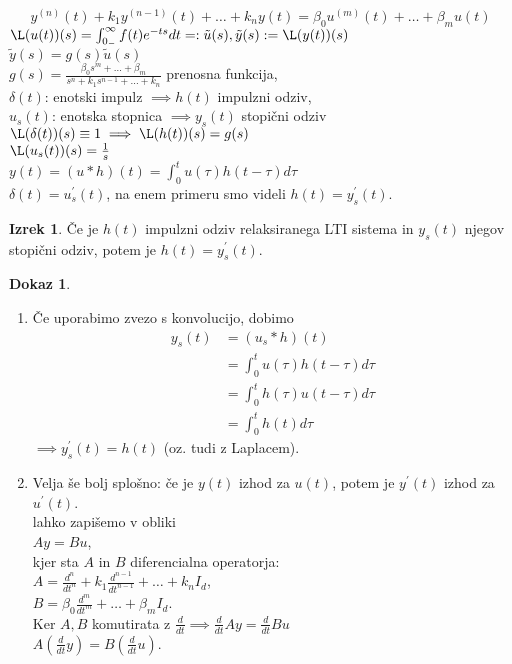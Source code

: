 \documentclass[a4paper, 12pt]{book}
\theoremstyle{definition}
\newtheorem{theorem}[counter]{Izrek}
\newtheorem{pro}[counter]{Dokaz}
\theoremstyle{remark}
\begin{document}

\begin{equation}
  \label{eq:sistem-poly}
  y^{(n)}(t) + k_1 y^{(n-1)}(t) + \dots + k_n y(t) = \beta_0 u^{(m)}(t) + \dots + \beta_m u(t)
\end{equation}
$\L(u(t))(s) = \int_{0_-}^{\infty} f(t) e^{-ts} dt =: \tilde{u}(s), \\
\tilde{y}(s) := \L(y(t))(s)$ \\
$\tilde{y}(s) = g(s) \tilde{u}(s)$ \\
$g(s) = \frac{\beta_0 s^m + \dots + \beta_m}{s^n + k_1 s^{n-1} + \dots + k_n}$ prenosna funkcija, \\
$\delta(t)$: enotski impulz $\implies h(t)$ impulzni odziv, \\
$u_s(t)$: enotska stopnica $\implies y_s(t)$ stopični odziv \\
$\L(\delta(t))(s) \equiv 1 \implies \L(h(t))(s) = g(s)$ \\
$\L(u_s(t))(s) = \frac{1}{s}$ \\
$y(t) = (u * h)(t) = \int_0^t u(\tau) h(t-\tau) d\tau$ \\
$\delta(t) = u_s^{'}(t)$, na enem primeru smo videli $h(t) = y_s^{'}(t)$.
\begin{theorem}
  Če je $h(t)$ impulzni odziv relaksiranega LTI sistema in $y_s(t)$ njegov stopični odziv,
  potem je $h(t) = y_s^{'}(t)$.
\end{theorem}
\begin{pro} \text{} \\
  \begin{enumerate}[label=\alph*)]
      \item Če uporabimo zvezo s konvolucijo, dobimo
          \begin{align*}
              y_s(t) &= (u_s * h)(t) \\
              &= \int_0^t u(\tau) h(t-\tau) d\tau \\
              &= \int_0^t h(\tau) u(t-\tau) d\tau \\
              &= \int_0^t h(t) d\tau
          \end{align*}
          $\implies y_s^{'}(t) = h(t)$ (oz. tudi z Laplacem).
      \item Velja še bolj splošno: če je $y(t)$ izhod za $u(t)$,
          potem je $y^{'}(t)$ izhod za $u^{'}(t)$. \\
           lahko zapišemo v obliki \\
          $A y = B u$, \\
          kjer sta $A$ in $B$ diferencialna operatorja: \\
          $A = \frac{d^n}{dt^n} + k_1 \frac{d^{n-1}}{dt^{n-1}} + \dots + k_n I_d$, \\
          $B = \beta_0 \frac{d^m}{dt^m} + \dots + \beta_m I_d$. \\
          Ker $A, B$ komutirata z $\frac{d}{dt} \implies
          \frac{d}{dt} A y = \frac{d}{dt} B u$ \\
          $A \left(\frac{d}{dt} y\right) = B \left(\frac{d}{dt} u \right)$.
  \end{enumerate}
\end{pro}
\end{document}

